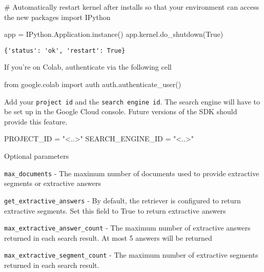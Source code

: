 \documentclass[
  letterpaper,
  DIV=11,
  numbers=noendperiod]{scrreprt}
\newenvironment{Shaded}{\begin{snugshade}}{\end{snugshade}}
\newcommand{\CommentTok}[1]{\textcolor[rgb]{0.37,0.37,0.37}{#1}}
\newcommand{\ImportTok}[1]{\textcolor[rgb]{0.00,0.46,0.62}{#1}}
\newcommand{\NormalTok}[1]{\textcolor[rgb]{0.00,0.23,0.31}{#1}}
\newcommand{\OperatorTok}[1]{\textcolor[rgb]{0.37,0.37,0.37}{#1}}
\newcommand{\StringTok}[1]{\textcolor[rgb]{0.13,0.47,0.30}{#1}}
\newcommand{\VariableTok}[1]{\textcolor[rgb]{0.07,0.07,0.07}{#1}}
\begin{document}
\begin{Shaded}
\begin{Highlighting}[]
\CommentTok{\# Automatically restart kernel after installs so that your environment can access the new packages}
\ImportTok{import}\NormalTok{ IPython}

\NormalTok{app }\OperatorTok{=}\NormalTok{ IPython.Application.instance()}
\NormalTok{app.kernel.do\_shutdown(}\VariableTok{True}\NormalTok{)}
\end{Highlighting}
\end{Shaded}

\begin{verbatim}
{'status': 'ok', 'restart': True}
\end{verbatim}

If you're on Colab, authenticate via the following cell

\begin{Shaded}
\begin{Highlighting}[]
\ImportTok{from}\NormalTok{ google.colab }\ImportTok{import}\NormalTok{ auth}
\NormalTok{auth.authenticate\_user()}
\end{Highlighting}
\end{Shaded}

Add your \texttt{project\ id} and the \texttt{search\ engine\ id}. The
search engine will have to be set up in the Google Cloud console. Future
versions of the SDK should provide this feature.

\begin{Shaded}
\begin{Highlighting}[]
\NormalTok{PROJECT\_ID }\OperatorTok{=} \StringTok{"\textless{}..\textgreater{}"}
\NormalTok{SEARCH\_ENGINE\_ID }\OperatorTok{=} \StringTok{"\textless{}..\textgreater{}"}
\end{Highlighting}
\end{Shaded}

Optional parameters

\texttt{max\_documents} - The maximum number of documents used to
provide extractive segments or extractive answers

\texttt{get\_extractive\_answers} - By default, the retriever is
configured to return extractive segments. Set this field to True to
return extractive answers

\texttt{max\_extractive\_answer\_count} - The maximum number of
extractive answers returned in each search result. At most 5 answers
will be returned

\texttt{max\_extractive\_segment\_count} - The maximum number of
extractive segments returned in each search result.
\end{document}
